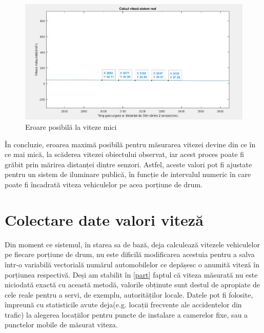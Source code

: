 \begin{figure}[!ht]
    \begin{center}
    \includegraphics[scale = 0.5]{pics/vmic.jpg}
    \end{center}
    \caption{Eroare posibilă la viteze mici}
    \label{fig:vmic}
\end{figure}

În concluzie, eroarea maximă posibilă pentru măsurarea vitezei devine din ce în ce mai mică, la scăderea vitezei obiectului observat, iar acest proces poate fi grăbit prin mărirea distanței dintre senzori. Astfel, aceste valori pot fi ajustate pentru un sistem de iluminare publică, în funcție de intervalul numeric în care poate fi încadrată viteza vehiculelor pe acea porțiune de drum.

\section{Colectare date valori viteză} \label{collect}

Din moment ce sistemul, în starea sa de bază, deja calculează vitezele vehiculelor pe fiecare porțiune de drum, nu este dificilă modificarea acestuia pentru a salva într-o variabilă vectorială numărul automobilelor ce depășesc o anumită viteză în porțiunea respectivă. Deși am stabilit în \autoref{part} faptul că viteza măsurată nu este niciodată exactă cu această metodă, valorile obținute sunt destul de apropiate de cele reale pentru a servi, de exemplu,  autorităților locale. Datele pot fi folosite, împreună cu statisticile avute deja(e.g. locații frecvente ale accidentelor din trafic) la alegerea locațiilor pentru puncte de instalare a camerelor fixe, sau a punctelor mobile de măsurat viteza.

